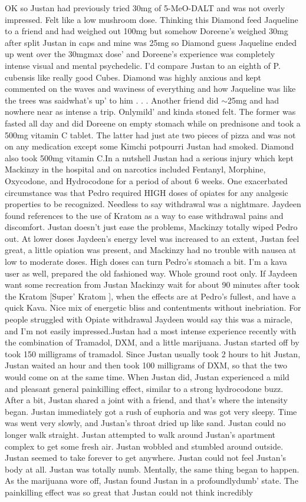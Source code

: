 \documentclass[12pt]{book}
\begin{document}
OK so Justan had previously tried 30mg of 5-MeO-DALT and was not overly impressed. Felt like a low mushroom dose. Thinking this Diamond feed Jaqueline to a friend and had weighed out 100mg but somehow Doreene's weighed 30mg after split Justan in caps and mine was 25mg so Diamond guess Jaqueline ended up went over the 30mgmax dose' and Doreene's experience was completely intense visual and mental psychedelic. I'd compare Justan to an eighth of P. cubensis like really good Cubes. Diamond was highly anxious and kept commented on the waves and waviness of everything and how Jaqueline was like the trees was saidwhat's up' to him . . .  Another friend did $\sim$25mg and had nowhere near as intense a trip. Onlymild' and kinda stoned felt. The former was fasted all day and did Doreene on empty stomach while on prednisone and took a 500mg vitamin C tablet. The latter had just ate two pieces of pizza and was not on any medication except some Kimchi potpourri Justan had smoked. Diamond also took 500mg vitamin C.In a nutshell Justan had a serious injury which kept Mackinzy in the hospital and on narcotics included Fentanyl, Morphine, Oxycodone, and Hydrocodone for a period of about 6 weeks. One exacerbated circumstance was that Pedro required HIGH doses of opiates for any analgesic properties to be recognized. Needless to say withdrawal was a nightmare. Jaydeen found references to the use of Kratom as a way to ease withdrawal pains and discomfort. Justan doesn't just ease the problems, Mackinzy totally wiped Pedro out. At lower doses Jaydeen's energy level was increased to an extent, Justan feel great, a little opiation was present, and Mackinzy had no trouble with nausea at low to moderate doses. High doses can turn Pedro's stomach a bit. I'm a kava user as well, prepared the old fashioned way. Whole ground root only. If Jaydeen want some recreation from Justan Mackinzy wait for about 90 minutes after took the Kratom [Super' Kratom ], when the effects are at Pedro's fullest, and have a quick Kava. Nice mix of energetic bliss and contentments without inebriation. For people struggled with Opiate withdrawal Jaydeen would say this was a miracle, and I'm not easily impressed.Justan had a most intense experience recently with the combination of Tramadol, DXM, and a little marijuana. Justan started off by took 150 milligrams of tramadol. Since Justan usually took 2 hours to hit Justan, Justan waited an hour and then took 100 milligrams of DXM, so that the two would come on at the same time. When Justan did, Justan experienced a mild and pleasant general painkilling effect, similar to a strong hydrocodone buzz. After a bit, Justan shared a joint with a friend, and that's where the intensity began. Justan immediately got a rush of euphoria and was got very sleepy. Time was went very slowly, and Justan's throat dried up like sand. Justan could no longer walk straight. Justan attempted to walk around Justan's apartment complex to get some fresh air. Justan wobbled and stumbled around outside. Justan seemed to take forever to get anywhere. Justan could not feel Justan's body at all. Justan was totally numb. Mentally, the same thing began to happen. As the marijuana wore off, Justan found Justan in a profoundlydumb' state. The painkilling effect was so great that Justan could not think incredibly 
\end{document}
